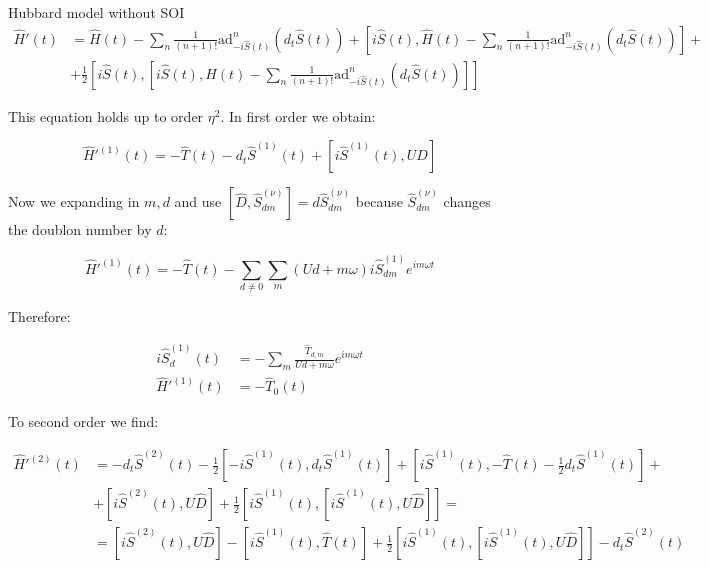 \begin{section}{Hubbard model without SOI}
\begin{align}
\label{PertTrunc}
\hat{H}'(t) &=  \hat{H}(t) - \sum_n \frac{1}{(n+1)!}\text{ad}_{-i\hat{S}(t)}^n (d_t \hat{S}(t)) + [i\hat{S}(t), \hat{H}(t) - \sum_n \frac{1}{(n+1)!}\text{ad}_{-i\hat{S}(t)}^n (d_t \hat{S}(t))] + \nonumber \\
&+ \frac{1}{2} [i\hat{S}(t),[i\hat{S}(t), \hat{H}(t) - \sum_n \frac{1}{(n+1)!}\text{ad}_{-i\hat{S}(t)}^n (d_t \hat{S}(t)) ]]
\end{align}

This equation holds up to order $\eta^2$. In first order we obtain:

\begin{equation}
\label{1stO}
\hat{H}'^{(1)}(t) = -\hat{T}(t) - d_t\hat{S}^{(1)}(t) + \left[ i\hat{S}^{(1)}(t), U\hat{D} \right]
\end{equation}

Now we expanding in $m,d$ and use $\left[ \hat{D}, \hat{S}^{(\nu)}_{dm} \right] = d\hat{S}^{(\nu)}_{dm}$ because $\hat{S}^{(\nu)}_{dm}$ changes the doublon number by $d$:

\begin{equation}
\hat{H}'^{(1)}(t)=-\hat{T}(t)-\sum_{d\neq 0}\sum_m (Ud+m\omega) i\hat{S}^{(1)}_{dm} e^{im\omega t}
\end{equation}

Therefore:

\begin{align}
i\hat{S}^{(1)}_d(t) &= -\sum_m \frac{\hat{T}_{d,m}}{Ud+m\omega}e^{im\omega t} \label{1stOSpin}\\
\hat{H}'^{(1)}(t) &= -\hat{T}_0(t) \label{1stOH}
\end{align}

To second order we find:

\begin{align}
\hat{H}'^{(2)}(t) &= - d_t\hat{S}^{(2)}(t) - \frac{1}{2}\left[-i\hat{S}^{(1)}(t), d_t\hat{S}^{(1)}(t) \right] + \left[i\hat{S}^{(1)}(t), -\hat{T}(t)-\frac{1}{2}d_t\hat{S}^{(1)}(t) \right] +\nonumber \\
&+ \left[i\hat{S}^{(2)}(t), U\hat{D} \right] + \frac{1}{2} \left[i\hat{S}^{(1)}(t), \left[i\hat{S}^{(1)}(t), U\hat{D} \right] \right] = \nonumber \\
&= \left[i\hat{S}^{(2)}(t), U \hat{D} \right] - \left[ i\hat{S}^{(1)}(t), \hat{T}(t) \right] + \frac{1}{2}\left[ i\hat{S}^{(1)}(t), \left[ i\hat{S}^{(1)}(t), U\hat{D} \right] \right] - d_t\hat{S}^{(2)}(t)
\end{align}


\end{section}
